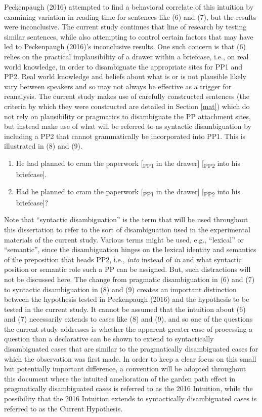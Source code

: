\documentclass[11pt,oneside]{book}
\begin{document}
Peckenpaugh (2016) attempted to find a behavioral correlate of this intuition by examining variation in reading time for sentences like (6) and (7), but the results were inconclusive. The current study continues that line of research by testing similar sentences, while also attempting to control certain factors that may have led to Peckenpaugh (2016)'s inconclusive results. One such concern is that (6) relies on the practical implausibility of a drawer within a briefcase, i.e., on real world knowledge, in order to disambiguate the appropriate sites for PP1 and PP2. Real world knowledge and beliefs about what is or is not plausible likely vary between speakers and so may not always be effective as a trigger for reanalysis. The current study makes use of carefully constructed sentences (the criteria by which they were constructed are detailed in Section \ref{mat}) which do not rely on plausibility or pragmatics to disambiguate the PP attachment sites, but instead make use of what will be referred to as syntactic disambiguation by including a PP2 that cannot grammatically be incorporated into PP1. This is illustrated in (8) and (9).

\begin{enumerate}
\def\labelenumi{(\arabic{enumi})}
\setcounter{enumi}{7}
\item
  He had planned to cram the paperwork {[}\textsubscript{PP1} in the drawer{]} {[}\textsubscript{PP2} into his briefcase{]}.
\item
  Had he planned to cram the paperwork {[}\textsubscript{PP1} in the drawer{]} {[}\textsubscript{PP2} into his briefcase{]}?
\end{enumerate}

Note that ``syntactic disambiguation'' is the term that will be used throughout this dissertation to refer to the sort of disambiguation used in the experimental materials of the current study. Various terms might be used, e.g., ``lexical'' or ``semantic'', since the disambiguation hinges on the lexical identity and semantics of the preposition that heads PP2, i.e., \emph{into} instead of \emph{in} and what syntactic position or semantic role such a PP can be assigned. But, such distractions will not be discussed here. The change from pragmatic disambiguation in (6) and (7) to syntactic disambiguation in (8) and (9) creates an important distinction between the hypothesis tested in Peckenpaugh (2016) and the hypothesis to be tested in the current study. It cannot be assumed that the intuition about (6) and (7) necessarily extends to cases like (8) and (9), and so one of the questions the current study addresses is whether the apparent greater ease of processing a question than a declarative can be shown to extend to syntactically disambiguated cases that are similar to the pragmatically disambiguated cases for which the observation was first made. In order to keep a clear focus on this small but potentially important difference, a convention will be adopted throughout this document where the intuited amelioration of the garden path effect in pragmatically disambiguated cases is referred to as the 2016 Intuition, while the possibility that the 2016 Intuition extends to syntactically disambiguated cases is referred to as the Current Hypothesis.
\end{document}
